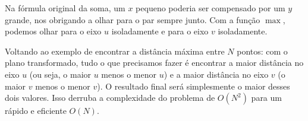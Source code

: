 Na fórmula original da soma, um $x$ pequeno poderia ser compensado por um $y$ grande, nos obrigando a olhar para o par sempre junto. Com a função $\max$, podemos olhar para o eixo $u$ isoladamente e para o eixo $v$ isoladamente. 

Voltando ao exemplo de encontrar a distância máxima entre $N$ pontos: com o plano transformado, tudo o que precisamos fazer é encontrar a maior distância no eixo $u$ (ou seja, o maior $u$ menos o menor $u$) e a maior distância no eixo $v$ (o maior $v$ menos o menor $v$). O resultado final será simplesmente o maior desses dois valores. Isso derruba a complexidade do problema de $O(N^2)$ para um rápido e eficiente $O(N)$.
